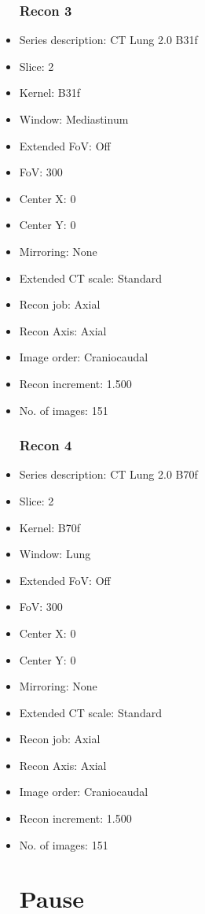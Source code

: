 \documentclass[12pt]{article}
\begin{document}
\begin{itemize}
\subsubsection{Recon 3}
\item Series description: CT Lung 2.0 B31f
\item Slice: 2
\item Kernel: B31f
\item Window: Mediastinum
\item Extended FoV: Off
\item FoV: 300
\item Center X: 0
\item Center Y: 0
\item Mirroring: None
\item Extended CT scale: Standard
\item Recon job: Axial
\item Recon Axis: Axial
\item Image order: Craniocaudal
\item Recon increment: 1.500
\item No. of images: 151
\subsubsection{Recon 4}
\item Series description: CT Lung 2.0 B70f
\item Slice: 2
\item Kernel: B70f
\item Window: Lung
\item Extended FoV: Off
\item FoV: 300
\item Center X: 0
\item Center Y: 0
\item Mirroring: None
\item Extended CT scale: Standard
\item Recon job: Axial
\item Recon Axis: Axial
\item Image order: Craniocaudal
\item Recon increment: 1.500
\item No. of images: 151
\section{Pause}

\end{itemize}
\end{document}
